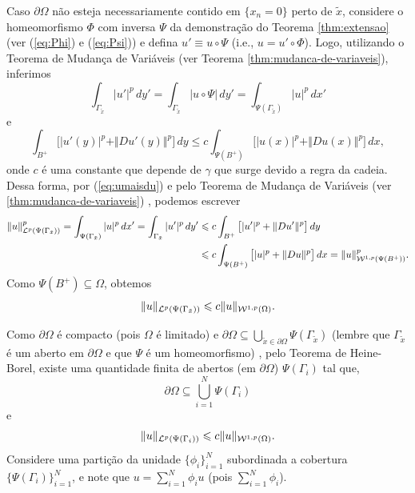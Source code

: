 \begin{prf}
    Caso $\partial \Omega$ não esteja necessariamente contido em $\{x_n =0 \}$ perto de $\tilde x$, considere o homeomorfismo $\Phi$  com inversa $\Psi$ da demonstração do Teorema \ref{thm:extensao} (ver (\ref{eq:Phi}) e (\ref{eq:Psi})) e defina $u' \equiv u \circ \Psi$ (i.e., $u = u' \circ \Phi$). Logo, utilizando o Teorema de Mudança de Variáveis (ver Teorema \ref{thm:mudanca-de-variaveis}), inferimos
    \[
        \int_{\Gamma_{\tilde x}} |u'|^p \,dy' = \int_{\Gamma_{\tilde x}} |u \circ \Psi| \, dy' = \int_{\Psi(\Gamma_{\tilde x})} |u|^p \,dx'
    \]
    e
    \[
        \int_{B^+} \big[ |u'(y)|^p + \Vert Du'(y) \Vert^p \big] \,dy \leqslant c\int_{\Psi(B^+)} \big[ |u(x)|^p + \Vert Du(x) \Vert^p \big] \,dx,
    \]
    onde $c$ é uma constante que depende de $\gamma$ que surge devido a regra da cadeia. Dessa forma, por (\ref{eq:umaisdu}) e pelo Teorema de Mudança de Variáveis (ver \ref{thm:mudanca-de-variaveis}) , podemos escrever
    \[
        \begin{aligned}
            \Vert u \Vert^p_{\mathcal{L}^p(\Psi(\Gamma_{\tilde x}))} = \int_{\Psi(\Gamma_{\tilde x})} |u|^p \,dx' = \int_{\Gamma_{\tilde x}} |u'|^p \,dy' &\leqslant c\int_{B^+} \big[ |u'|^p + \Vert Du' \Vert^p \big]\,dy\\ 
            &\leqslant c \int_{\Psi(B^+)} \big[ |u|^p + \Vert Du \Vert^p \big] \,dx = \Vert u \Vert_{\mathcal{W}^{1,p}(\Psi(B^+))}^p.
        \end{aligned}
    \]
    Como $\Psi(B^+) \subseteq \Omega$, obtemos 
    \[
        \Vert u \Vert_{\mathcal{L}^p(\Psi(\Gamma_{\tilde x}))} \leqslant c \Vert u \Vert_{\mathcal{W}^{1,p}(\Omega)}.
    \]

    Como $\partial\Omega$ é compacto (pois $\Omega$ é limitado) e $\partial \Omega \subseteq \bigcup_{\tilde x \in \partial \Omega} \Psi(\Gamma_{\tilde x})$ (lembre que $\Gamma_{\tilde x}$ é um aberto em $\partial\Omega$ e que $\Psi$ é um homeomorfismo) , pelo Teorema de Heine-Borel, existe uma quantidade finita de abertos (em $\partial \Omega$) $\Psi(\Gamma_i)$ tal que,
    \[
        \partial\Omega \subseteq \bigcup_{i=1}^N \Psi(\Gamma_i)
    \]
    e
    \begin{equation} \label{eq:1111}
        \Vert u \Vert_{\mathcal{L}^p(\Psi(\Gamma_i))} \leqslant c \Vert u \Vert_{\mathcal{W}^{1,p}(\Omega)}.
    \end{equation}
    Considere uma partição da unidade $\{\phi_i\}_{i=1}^N$ subordinada a cobertura $\{\Psi(\Gamma_i)\}_{i=1}^N$, e note que $u = \sum_{i=1}^N \phi_i u$ (pois $\sum_{i=1}^N \phi_i$).


\end{prf}
